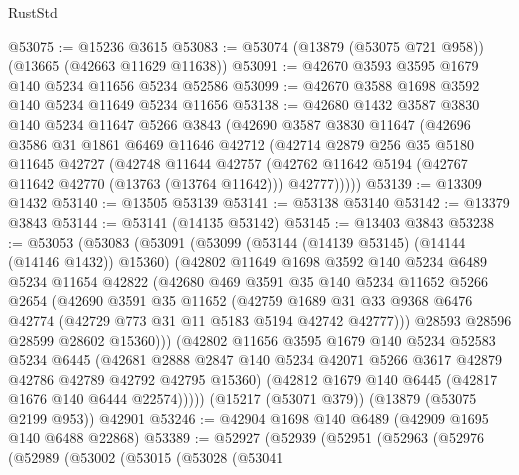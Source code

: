 \begin{lexlean}{RustStd}
\begin{coremodule}
@53075 := @15236 @3615
@53083 := @53074 (@13879 (@53075 @721 @958)) (@13665 (@42663 @11629 @11638))
@53091 := @42670 @3593 @3595 @1679 @140 @5234 @11656 @5234 @52586
@53099 := @42670 @3588 @1698 @3592 @140 @5234 @11649 @5234 @11656
@53138 := @42680
    @1432
    @3587
    @3830
    @140
    @5234
    @11647
    @5266
    @3843
    (@42690
      @3587
      @3830
      @11647
      (@42696
        @3586
        @31
        @1861
        @6469
        @11646
        @42712
        (@42714
          @2879
          @256
          @35
          @5180
          @11645
          @42727
          (@42748
            @11644
            @42757
            (@42762 @11642 @5194 (@42767 @11642 @42770 (@13763 (@13764 @11642))) @42777)))))
@53139 := @13309 @1432
@53140 := @13505 @53139
@53141 := @53138 @53140
@53142 := @13379 @3843
@53144 := @53141 (@14135 @53142)
@53145 := @13403 @3843
@53238 := @53053
    (@53083
      (@53091
        (@53099
          (@53144 (@14139 @53145) (@14144 (@14146 @1432)) @15360)
          (@42802
            @11649
            @1698
            @3592
            @140
            @5234
            @6489
            @5234
            @11654
            @42822
            (@42680
              @469
              @3591
              @35
              @140
              @5234
              @11652
              @5266
              @2654
              (@42690
                @3591
                @35
                @11652
                (@42759
                  @1689
                  @31
                  @33
                  @9368
                  @6476
                  @42774
                  (@42729 @773 @31 @11 @5183 @5194 @42742 @42777)))
              @28593
              @28596
              @28599
              @28602
              @15360)))
        (@42802
          @11656
          @3595
          @1679
          @140
          @5234
          @52583
          @5234
          @6445
          (@42681
            @2888
            @2847
            @140
            @5234
            @42071
            @5266
            @3617
            @42879
            @42786
            @42789
            @42792
            @42795
            @15360)
          (@42812 @1679 @140 @6445 (@42817 @1676 @140 @6444 @22574)))))
    (@15217 (@53071 @379))
    (@13879 (@53075 @2199 @953))
    @42901
@53246 := @42904 @1698 @140 @6489 (@42909 @1695 @140 @6488 @22868)
@53389 := @52927
    (@52939
      (@52951
        (@52963
          (@52976
            (@52989
              (@53002
                (@53015
                  (@53028
                    (@53041

\end{coremodule}
\end{lexlean}
